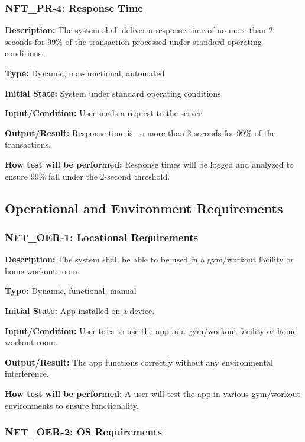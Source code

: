 \documentclass[12pt, titlepage]{article}
\begin{document}
\subsubsection*{\textbf{NFT\_PR-4: Response Time}
}

\textbf{Description: }The system shall deliver a response time of no more than 2 seconds for 99\% of the transaction processed under standard operating conditions.

\textbf{Type:} Dynamic, non-functional, automated

\textbf{Initial State:} System under standard operating conditions.

\textbf{Input/Condition: }User sends a request to the server.

\textbf{Output/Result:} Response time is no more than 2 seconds for 99\% of the transactions.

\textbf{How test will be performed:} Response times will be logged and analyzed to ensure 99\% fall under the 2-second threshold.
\newline
\subsection{Operational and Environment Requirements}


\subsubsection*{\textbf{NFT\_OER-1: Locational Requirements}
}

\textbf{Description: }The system shall be able to be used in a gym/workout facility or home workout room. 

\textbf{Type: }Dynamic, functional, manual

\textbf{Initial State: }App installed on a device.

\textbf{Input/Condition:} User tries to use the app in a gym/workout facility or home workout room.

\textbf{Output/Result:} The app functions correctly without any environmental interference.

\textbf{How test will be performed:} A user will test the app in various gym/workout environments to ensure functionality.


\subsubsection*{\textbf{NFT\_OER-2: OS Requirements}
}
\end{document}

